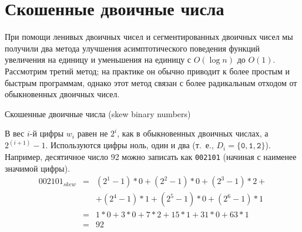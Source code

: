 \begin{comment}
\begin{exercise}\label{ex:9.13}
  Реализуйте \lstinline!cons!, \lstinline!head!, \lstinline!tail! и
  \lstinline!lookup! для числового представления списков с
  произвольным доступом на основе системы счисления из предыдущего
  упражнения. Ваше представление должно поддерживать \lstinline!cons!,
  \lstinline!head! и \lstinline!tail! за время $O(1)$ в худшем случае,
  а \lstinline!lookup! за время $O(\log n)$ в худшем случае.
\end{exercise}

\end{frame}
\end{comment}

\section{Скошенные двоичные числа}
\label{sc:9.3}

\begin{frame}[fragile]{}



При помощи ленивых двоичных чисел и сегментированных двоичных чисел мы
получили два метода улучшения асимптотического поведения функций
увеличения на единицу и уменьшения на единицу с $O(\log n)$ до
$O(1)$. \\


Рассмотрим третий метод; на практике он
обычно приводит к более простым и быстрым программам, однако этот
метод связан с более радикальным отходом от обыкновенных двоичных
чисел. \\

\end{frame}

\begin{frame}[fragile]{Скошенные двоичные числа (skew binary numbers)}

В 
\cite{Myers1983, Okasaki1995b} вес
$i$-й цифры $w_i$ равен не $2^i$, как в обыкновенных двоичных числах,
а $2^{(i+1)} - 1$. Используются цифры ноль, один и два (т.~е., $D_i =
\{\mathtt{0}, \mathtt{1}, \mathtt{2}\}$). Например, десятичное число
92 можно записать как \texttt{002101} (начиная с наименее значимой
цифры).\\

\begin{align*} 
002101_{skew} & =& (2^1-1)*0 + (2^2-1)*0 + (2^3-1)*2 + \\ 
              &  & + (2^4-1)*1 + (2^5-1)*0 + (2^6-1)*1 \\
& = &1*0 + 3*0 + 7*2 + 15*1 + 31*0 + 63*1              \\
& = &92
\end{align*}



\end{frame}

